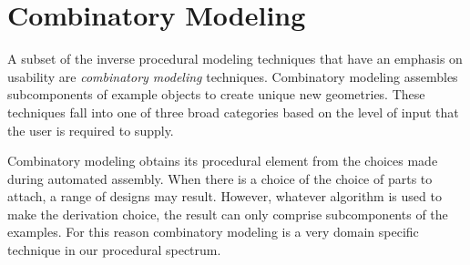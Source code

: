 



\section{Combinatory Modeling} 

A subset of the inverse procedural modeling techniques that have an emphasis on usability are \emph{combinatory modeling} techniques.  Combinatory modeling assembles subcomponents of example objects to create unique new geometries. These techniques fall into one of three broad categories based on the level of input that the user is required to supply. %

Combinatory modeling obtains its procedural element from the choices made during automated assembly. When there is a choice of the choice of parts to attach, a range of designs may result. However, whatever algorithm is used to make the derivation choice, the result can only comprise subcomponents of the examples. For this reason combinatory modeling is a very domain specific technique in our procedural spectrum.

